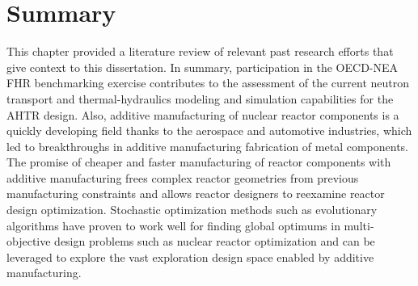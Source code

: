 \section{Summary}
This chapter provided a literature review of relevant past research 
efforts that give context to this dissertation. 
In summary, participation in the OECD-NEA FHR benchmarking exercise contributes 
to the assessment of the current neutron transport and thermal-hydraulics 
modeling and simulation capabilities for the \gls{AHTR} design.
Also, additive manufacturing of nuclear reactor components is a quickly 
developing field thanks to the aerospace and automotive industries, which led to 
breakthroughs in additive manufacturing fabrication of metal components. 
The promise of cheaper and faster manufacturing of reactor components with 
additive manufacturing frees complex reactor geometries from previous 
manufacturing constraints and allows reactor designers to reexamine reactor 
design optimization.  
Stochastic optimization methods such as evolutionary algorithms have proven to 
work well for finding global optimums in multi-objective design problems such as 
nuclear reactor optimization and can be leveraged to explore the vast exploration 
design space enabled by additive manufacturing.
